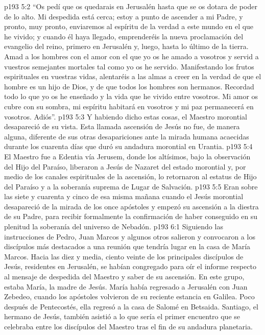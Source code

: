 \vs p193 5:2 \pc “Os pedí que os quedarais en Jerusalén hasta que se os dotara de poder de lo alto. Mi despedida está cerca; estoy a punto de ascender a mi Padre, y pronto, muy pronto, enviaremos al espíritu de la verdad a este mundo en el que he vivido; y cuando él haya llegado, emprenderéis la nueva proclamación del evangelio del reino, primero en Jerusalén y, luego, hasta lo último de la tierra. Amad a los hombres con el amor con el que yo os he amado a vosotros y servid a vuestros semejantes mortales tal como yo os he servido. Manifestando los frutos espirituales en vuestras vidas, alentaréis a las almas a creer en la verdad de que el hombre es un hijo de Dios, y de que todos los hombres son hermanos. Recordad todo lo que yo os he enseñado y la vida que he vivido entre vosotros. Mi amor os cubre con su sombra, mi espíritu habitará en vosotros y mi paz permanecerá en vosotros. Adiós”.
\vs p193 5:3 \pc Y habiendo dicho estas cosas, el Maestro morontial desapareció de su vista. Esta llamada ascensión de Jesús no fue, de manera alguna, diferente de sus otras desapariciones ante la mirada humana acaecidas durante los cuarenta días que duró su andadura morontial en Urantia.
\vs p193 5:4 El Maestro fue a Edentia vía Jerusem, donde los altísimos, bajo la observación del Hijo del Paraíso, liberaron a Jesús de Nazaret del estado morontial y, por medio de los canales espirituales de la ascensión, lo retornaron al estatus de Hijo del Paraíso y a la soberanía suprema de Lugar de Salvación.
\vs p193 5:5 Eran sobre las siete y cuarenta y cinco de esa misma mañana cuando el Jesús morontial desapareció de la mirada de los once apóstoles y empezó su ascensión a la diestra de su Padre, para recibir formalmente la confirmación de haber conseguido en su plenitud la soberanía del universo de Nebadón.
\vs p193 6:1 Siguiendo las instrucciones de Pedro, Juan Marcos y algunos otros salieron y convocaron a los discípulos más destacados a una reunión que tendría lugar en la casa de María Marcos. Hacia las diez y media, ciento veinte de los principales discípulos de Jesús, residentes en Jerusalén, se habían congregado para oír el informe respecto al mensaje de despedida del Maestro y saber de su ascensión. En este grupo, estaba María, la madre de Jesús. María había regresado a Jerusalén con Juan Zebedeo, cuando los apóstoles volvieron de su reciente estancia en Galilea. Poco después de Pentecostés, ella regresó a la casa de Salomé en Betsaida. Santiago, el hermano de Jesús, también asistió a lo que sería el primer encuentro que se celebraba entre los discípulos del Maestro tras el fin de su andadura planetaria.
